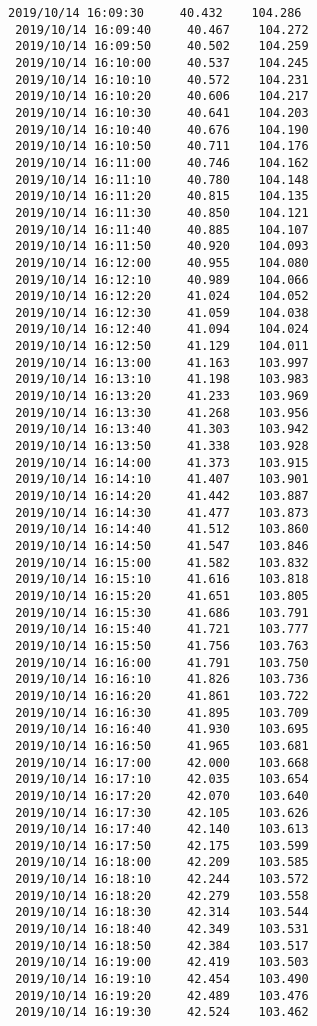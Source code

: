 \documentclass[11pt]{article}
\begin{document}
\begin{Verbatim}[commandchars=\\\{\}]
 2019/10/14 16:09:30     40.432    104.286
 2019/10/14 16:09:40     40.467    104.272
 2019/10/14 16:09:50     40.502    104.259
 2019/10/14 16:10:00     40.537    104.245
 2019/10/14 16:10:10     40.572    104.231
 2019/10/14 16:10:20     40.606    104.217
 2019/10/14 16:10:30     40.641    104.203
 2019/10/14 16:10:40     40.676    104.190
 2019/10/14 16:10:50     40.711    104.176
 2019/10/14 16:11:00     40.746    104.162
 2019/10/14 16:11:10     40.780    104.148
 2019/10/14 16:11:20     40.815    104.135
 2019/10/14 16:11:30     40.850    104.121
 2019/10/14 16:11:40     40.885    104.107
 2019/10/14 16:11:50     40.920    104.093
 2019/10/14 16:12:00     40.955    104.080
 2019/10/14 16:12:10     40.989    104.066
 2019/10/14 16:12:20     41.024    104.052
 2019/10/14 16:12:30     41.059    104.038
 2019/10/14 16:12:40     41.094    104.024
 2019/10/14 16:12:50     41.129    104.011
 2019/10/14 16:13:00     41.163    103.997
 2019/10/14 16:13:10     41.198    103.983
 2019/10/14 16:13:20     41.233    103.969
 2019/10/14 16:13:30     41.268    103.956
 2019/10/14 16:13:40     41.303    103.942
 2019/10/14 16:13:50     41.338    103.928
 2019/10/14 16:14:00     41.373    103.915
 2019/10/14 16:14:10     41.407    103.901
 2019/10/14 16:14:20     41.442    103.887
 2019/10/14 16:14:30     41.477    103.873
 2019/10/14 16:14:40     41.512    103.860
 2019/10/14 16:14:50     41.547    103.846
 2019/10/14 16:15:00     41.582    103.832
 2019/10/14 16:15:10     41.616    103.818
 2019/10/14 16:15:20     41.651    103.805
 2019/10/14 16:15:30     41.686    103.791
 2019/10/14 16:15:40     41.721    103.777
 2019/10/14 16:15:50     41.756    103.763
 2019/10/14 16:16:00     41.791    103.750
 2019/10/14 16:16:10     41.826    103.736
 2019/10/14 16:16:20     41.861    103.722
 2019/10/14 16:16:30     41.895    103.709
 2019/10/14 16:16:40     41.930    103.695
 2019/10/14 16:16:50     41.965    103.681
 2019/10/14 16:17:00     42.000    103.668
 2019/10/14 16:17:10     42.035    103.654
 2019/10/14 16:17:20     42.070    103.640
 2019/10/14 16:17:30     42.105    103.626
 2019/10/14 16:17:40     42.140    103.613
 2019/10/14 16:17:50     42.175    103.599
 2019/10/14 16:18:00     42.209    103.585
 2019/10/14 16:18:10     42.244    103.572
 2019/10/14 16:18:20     42.279    103.558
 2019/10/14 16:18:30     42.314    103.544
 2019/10/14 16:18:40     42.349    103.531
 2019/10/14 16:18:50     42.384    103.517
 2019/10/14 16:19:00     42.419    103.503
 2019/10/14 16:19:10     42.454    103.490
 2019/10/14 16:19:20     42.489    103.476
 2019/10/14 16:19:30     42.524    103.462

\end{Verbatim}
\end{document}
